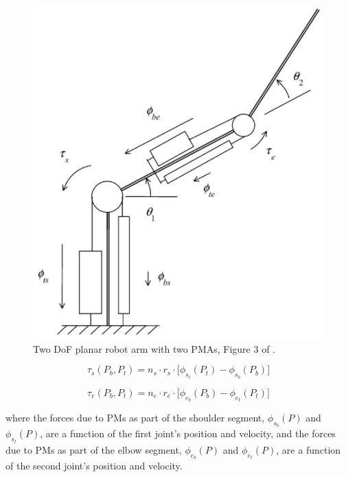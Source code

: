 \documentclass[conference]{IEEEtran}
\begin{document}
	\begin{figure}[htbp]
		\label{fig:pma_robot_arm}
		\centerline{\includegraphics[width=\columnwidth]{images/two_dof_planar_pma_robot_arm.jpg}}
		\caption{Two \ac{DoF} planar robot arm with two \acp{PMA}, Figure 3 of \cite{main-article}.}
	\end{figure}
	
	\begin{equation}\label{eq:torque_pm_s}
		\tau_{s}(P_{b}, P_{t}) = n_{s} \cdot r_{s} \cdot \lbrack\phi_{s_{t}}(P_{t}) - \phi_{s_{b}}(P_{b}) \rbrack
	\end{equation}

	\begin{equation}\label{eq:torque_pm_e}
		\tau_{e}(P_{b}, P_{t}) = n_{e} \cdot r_{e} \cdot \lbrack\phi_{e_{b}}(P_{b}) - \phi_{e_{t}}(P_{t}) \rbrack
	\end{equation}

	where the forces due to \acp{PM} as part of the shoulder segment, $\phi_{s_{b}}(P)$ and $\phi_{s_{t}}(P)$, are a function of the first joint's position and velocity, and the forces due to \acp{PM} as part of the elbow segment, $\phi_{e_{b}}(P)$ and $\phi_{e_{t}}(P)$, are a function of the second joint's position and velocity.
\end{document}
